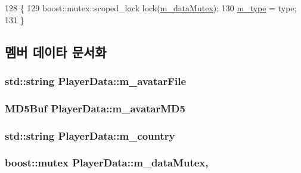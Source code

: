 \begin{DoxyCode}
128 \{
129     boost::mutex::scoped\_lock lock(\hyperlink{class_player_data_a8e1276aab88bec3fa48e3c59f193827e}{m\_dataMutex});
130     \hyperlink{class_player_data_a3e4b8d9fcda3d2def5f0a79468a87903}{m\_type} = type;
131 \}
\end{DoxyCode}


\subsection{멤버 데이타 문서화}
\hypertarget{class_player_data_aa3342ab34d521ab87edd40ec7622be56}{
\subsubsection[{m\-\_\-avatar\-File}]{\setlength{\rightskip}{0pt plus 5cm}std\-::string Player\-Data\-::m\-\_\-avatar\-File\hspace{0.3cm}{\ttfamily [private]}}}\label{class_player_data_aa3342ab34d521ab87edd40ec7622be56}
\hypertarget{class_player_data_a5a6b19ae010990245ed6214be517f2cf}{
\subsubsection[{m\-\_\-avatar\-M\-D5}]{\setlength{\rightskip}{0pt plus 5cm}M\-D5\-Buf Player\-Data\-::m\-\_\-avatar\-M\-D5\hspace{0.3cm}{\ttfamily [private]}}}\label{class_player_data_a5a6b19ae010990245ed6214be517f2cf}
\hypertarget{class_player_data_af349fdb550aaac72ccaead9a156be844}{
\subsubsection[{m\-\_\-country}]{\setlength{\rightskip}{0pt plus 5cm}std\-::string Player\-Data\-::m\-\_\-country\hspace{0.3cm}{\ttfamily [private]}}}\label{class_player_data_af349fdb550aaac72ccaead9a156be844}
\hypertarget{class_player_data_a8e1276aab88bec3fa48e3c59f193827e}{
\subsubsection[{m\-\_\-data\-Mutex}]{\setlength{\rightskip}{0pt plus 5cm}boost\-::mutex Player\-Data\-::m\-\_\-data\-Mutex\hspace{0.3cm}{\ttfamily [mutable]}, {\ttfamily [private]}}}\label{class_player_data_a8e1276aab88bec3fa48e3c59f193827e}
